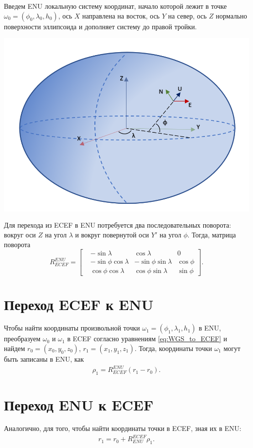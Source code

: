 \documentclass[a4paper,12pt]{article}
\begin{document}
Введем ENU локальную систему координат,
начало которой лежит в точке $\omega_0 = (\phi_0, \lambda_0, h_0)$,
ось $X$ направлена на восток,
ось $Y$ на север,
ось $Z$ нормально поверхности эллипсоида и дополняет систему до правой тройки.

\includegraphics[width=\textwidth]{ecef_enu}

Для перехода из ECEF в ENU потребуется два последовательных поворота:
вокруг оси $Z$ на угол $\lambda$
и вокруг повернутой оси $Y'$ на угол $\phi$.
Тогда, матрица поворота
\begin{equation}
R_{ECEF}^{ENU} = 
\begin{bmatrix} \label{eq:R_ECEF_ENU}
&-\sin \lambda &\cos \lambda &0 \\
&-\sin \phi \cos \lambda &-\sin \phi \sin \lambda &\cos \phi \\
&\cos \phi \cos \lambda &\cos \phi \sin \lambda &\sin \phi 
\end{bmatrix}
.
\end{equation}


\section{Переход ECEF к ENU}
Чтобы найти координаты произвольной точки $\omega_1 = (\phi_1, \lambda_1, h_1)$ в ENU,
преобразуем $\omega_0$ и $\omega_1$ в ECEF согласно уравнениям \eqref{eq:WGS_to_ECEF}
и найдем  $r_0 = (x_0, y_0, z_0)$, $r_1 = (x_1, y_1, z_1)$.
Тогда, координаты точки $\omega_1$ могут быть записаны в ENU, как
\begin{align} 
\rho_1 = R_{ECEF}^{ENU} (r_1 - r_0).
\end{align}

\section{Переход ENU к ECEF}
Аналогично, для того, чтобы найти координаты точки в ECEF, зная их в ENU:
\begin{align} 
r_1 = r_0 + R_{ENU}^{ECEF} \rho_1.
\end{align}
\end{document}
